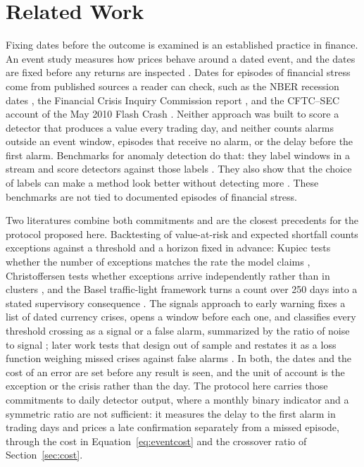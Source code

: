 \documentclass[pdflatex,sn-mathphys-num,iicol]{sn-jnl}
\begin{document}
\section{Related Work}
\label{sec:related}
Fixing dates before the outcome is examined is an established practice in finance. An event study measures how prices behave around a dated event, and the dates are fixed before any returns are inspected \cite{brown1985, mackinlay1997}. Dates for episodes of financial stress come from published sources a reader can check, such as the NBER recession dates \cite{nber2023}, the Financial Crisis Inquiry Commission report \cite{fcic2011}, and the CFTC--SEC account of the May 2010 Flash Crash \cite{cftcsec2010}. Neither approach was built to score a detector that produces a value every trading day, and neither counts alarms outside an event window, episodes that receive no alarm, or the delay before the first alarm. Benchmarks for anomaly detection do that: they label windows in a stream and score detectors against those labels \cite{lavin2015, ahmad2017}. They also show that the choice of labels can make a method look better without detecting more \cite{wu2022}. These benchmarks are not tied to documented episodes of financial stress.

Two literatures combine both commitments and are the closest precedents for the protocol proposed here. Backtesting of value-at-risk and expected shortfall counts exceptions against a threshold and a horizon fixed in advance: Kupiec tests whether the number of exceptions matches the rate the model claims \cite{kupiec1995}, Christoffersen tests whether exceptions arrive independently rather than in clusters \cite{christoffersen1998}, and the Basel traffic-light framework turns a count over 250 days into a stated supervisory consequence \cite{bcbs1996}. The signals approach to early warning fixes a list of dated currency crises, opens a window before each one, and classifies every threshold crossing as a signal or a false alarm, summarized by the ratio of noise to signal \cite{kaminsky1998}; later work tests that design out of sample \cite{berg1999} and restates it as a loss function weighing missed crises against false alarms \cite{bussiere2006}. In both, the dates and the cost of an error are set before any result is seen, and the unit of account is the exception or the crisis rather than the day. The protocol here carries those commitments to daily detector output, where a monthly binary indicator and a symmetric ratio are not sufficient: it measures the delay to the first alarm in trading days and prices a late confirmation separately from a missed episode, through the cost in Equation~\eqref{eq:eventcost} and the crossover ratio of Section~\ref{sec:cost}.
\end{document}
